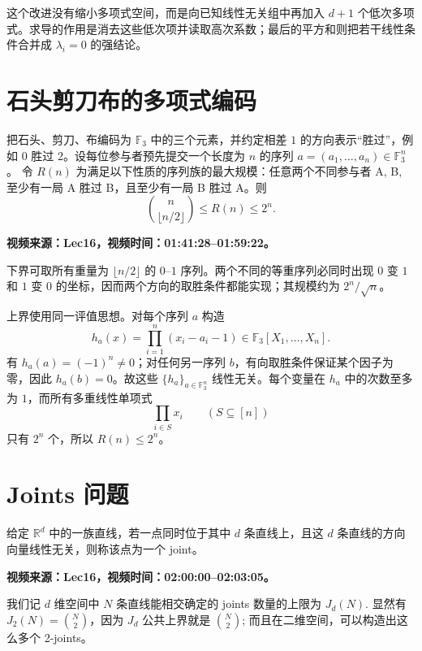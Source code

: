 这个改进没有缩小多项式空间，而是向已知线性无关组中再加入 $d+1$ 个低次多项式。求导的作用是消去这些低次项并读取高次系数；最后的平方和则把若干线性条件合并成 $\lambda_i=0$ 的强结论。

\section{石头剪刀布的多项式编码}

\begin{example}
把石头、剪刀、布编码为 $\mathbb{F}_3$ 中的三个元素，并约定相差 $1$ 的方向表示“胜过”，例如 0 胜过 2。设每位参与者预先提交一个长度为 $n$ 的序列
$a=(a_1,\dots,a_n)\in\mathbb{F}_3^n$。
令 $R(n)$ 为满足以下性质的序列族的最大规模：任意两个不同参与者 A, B, 至少有一局 A 胜过 B，且至少有一局 B 胜过 A。则
\[
\binom{n}{\lfloor n/2\rfloor}\leq R(n)\leq2^n.
\]

\ifdefined\VideoNotesTestMode
\textbf{视频来源：Lec16，视频时间：01:41:28--01:59:22。}
\fi
\end{example}

下界可取所有重量为 $\lfloor n/2\rfloor$ 的 $0$--$1$ 序列。两个不同的等重序列必同时出现 $0$ 变 $1$ 和 $1$ 变 $0$ 的坐标，因而两个方向的取胜条件都能实现；其规模约为 $2^n/\sqrt{n}$。

上界使用同一评值思想。对每个序列 $a$ 构造
\[
h_a(x)=\prod_{i=1}^n(x_i-a_i-1)\in\mathbb F_3[X_1,\dots,X_n].
\]
有 $h_a(a)=(-1)^n\ne0$；对任何另一序列 $b$，有向取胜条件保证某个因子为零，因此 $h_a(b)=0$。故这些 $\{h_a\}_{a\in\mathbb{F}_3^n}$ 线性无关。每个变量在 $h_a$ 中的次数至多为 $1$，而所有多重线性单项式
\[
\prod_{i\in S}x_i\qquad(S\subseteq[n])
\]
只有 $2^n$ 个，所以 $R(n)\leq2^n$。

\section{Joints 问题}

\begin{definition}[Joint]
给定 $\mathbb{R}^d$ 中的一族直线，若一点同时位于其中 $d$ 条直线上，且这 $d$ 条直线的方向向量线性无关，则称该点为一个 joint。

\ifdefined\VideoNotesTestMode
\textbf{视频来源：Lec16，视频时间：02:00:00--02:03:05。}
\fi
\end{definition}

我们记 $d$ 维空间中 $N$ 条直线能相交确定的 joints 数量的上限为 $J_d(N)$. 
显然有 $J_2(N)={N\choose 2}$，因为 $J_d$ 公共上界就是 ${N\choose 2}$; 而且在二维空间，可以构造出这么多个 2-joints。

